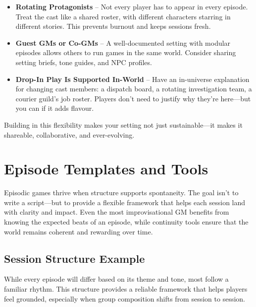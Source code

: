 \begin{itemize}\raggedright
    \item \textbf{Rotating Protagonists} – Not every player has to appear in every episode. Treat the cast like a shared roster, with different characters starring in different stories. This prevents burnout and keeps sessions fresh.

    \item \textbf{Guest GMs or Co-GMs} – A well-documented setting with modular episodes allows others to run games in the same world. Consider sharing setting briefs, tone guides, and NPC profiles.

    \item \textbf{Drop-In Play Is Supported In-World} – Have an in-universe explanation for changing cast members: a dispatch board, a rotating investigation team, a courier guild’s job roster. Players don’t need to justify why they’re here—but you can if it adds flavour.
\end{itemize}

Building in this flexibility makes your setting not just sustainable—it makes it shareable, collaborative, and ever-evolving.



\section{Episode Templates and Tools}

Episodic games thrive when structure supports spontaneity. The goal isn’t to write a script—but to provide a flexible framework that helps each session land with clarity and impact. Even the most improvisational GM benefits from knowing the expected beats of an episode, while continuity tools ensure that the world remains coherent and rewarding over time.

\subsection*{Session Structure Example}

While every episode will differ based on its theme and tone, most follow a familiar rhythm. This structure provides a reliable framework that helps players feel grounded, especially when group composition shifts from session to session.

